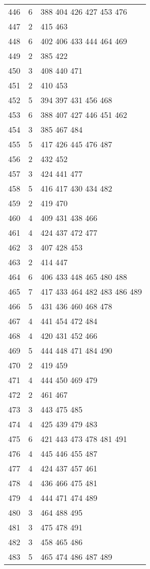 \documentclass{standalone}
\begin{document}
\begin{tabular}{c c l}
446 & 6 & 388 404 426 427 453 476 \\
447 & 2 & 415 463 \\
448 & 6 & 402 406 433 444 464 469 \\
449 & 2 & 385 422 \\
450 & 3 & 408 440 471 \\
451 & 2 & 410 453 \\
452 & 5 & 394 397 431 456 468 \\
453 & 6 & 388 407 427 446 451 462 \\
454 & 3 & 385 467 484 \\
455 & 5 & 417 426 445 476 487 \\
456 & 2 & 432 452 \\
457 & 3 & 424 441 477 \\
458 & 5 & 416 417 430 434 482 \\
459 & 2 & 419 470 \\
460 & 4 & 409 431 438 466 \\
461 & 4 & 424 437 472 477 \\
462 & 3 & 407 428 453 \\
463 & 2 & 414 447 \\
464 & 6 & 406 433 448 465 480 488 \\
465 & 7 & 417 433 464 482 483 486 489 \\
466 & 5 & 431 436 460 468 478 \\
467 & 4 & 441 454 472 484 \\
468 & 4 & 420 431 452 466 \\
469 & 5 & 444 448 471 484 490 \\
470 & 2 & 419 459 \\
471 & 4 & 444 450 469 479 \\
472 & 2 & 461 467 \\
473 & 3 & 443 475 485 \\
474 & 4 & 425 439 479 483 \\
475 & 6 & 421 443 473 478 481 491 \\
476 & 4 & 445 446 455 487 \\
477 & 4 & 424 437 457 461 \\
478 & 4 & 436 466 475 481 \\
479 & 4 & 444 471 474 489 \\
480 & 3 & 464 488 495 \\
481 & 3 & 475 478 491 \\
482 & 3 & 458 465 486 \\
483 & 5 & 465 474 486 487 489 \\

\end{tabular}
\end{document}
